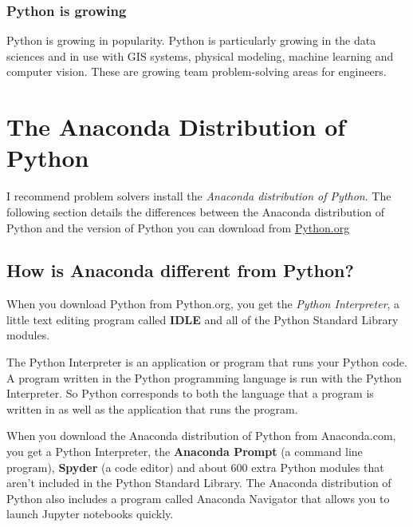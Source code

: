 \documentclass{book}
\begin{document}
\hypertarget{python-is-growing}{%
\subsubsection{Python is growing}\label{python-is-growing}}

Python is growing in popularity. Python is particularly growing in the
data sciences and in use with GIS systems, physical modeling, machine
learning and computer vision. These are growing team problem-solving
areas for engineers.
    




    
        \hypertarget{the-anaconda-distribution-of-python}{%
\section{The Anaconda Distribution of
Python}\label{the-anaconda-distribution-of-python}}
    




    
        I recommend problem solvers install the \emph{Anaconda distribution of
Python}. The following section details the differences between the
Anaconda distribution of Python and the version of Python you can
download from \href{https://python.org}{Python.org}
    




    
        \hypertarget{how-is-anaconda-different-from-python}{%
\subsection{How is Anaconda different from
Python?}\label{how-is-anaconda-different-from-python}}

When you download Python from Python.org, you get the \emph{Python
Interpreter}, a little text editing program called \textbf{IDLE} and all
of the Python Standard Library modules.

The Python Interpreter is an application or program that runs your
Python code. A program written in the Python programming language is run
with the Python Interpreter. So Python corresponds to both the language
that a program is written in as well as the application that runs the
program.

When you download the Anaconda distribution of Python from Anaconda.com,
you get a Python Interpreter, the \textbf{Anaconda Prompt} (a command
line program), \textbf{Spyder} (a code editor) and about 600 extra
Python modules that aren't included in the Python Standard Library. The
Anaconda distribution of Python also includes a program called Anaconda
Navigator that allows you to launch Jupyter notebooks quickly.
    
\end{document}
